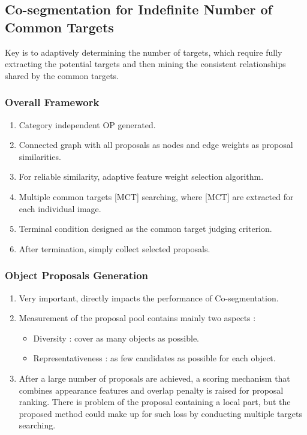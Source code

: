 \documentclass{article}
\begin{document}
\subsection{Co-segmentation for Indefinite Number of Common Targets}
Key is to adaptively determining the number of targets, which require fully extracting the potential targets and then mining the consistent relationships shared by the common targets.

\subsubsection{Overall Framework}
\begin{enumerate}
\item Category independent OP generated.
\item Connected graph with all proposals as nodes and edge weights as proposal similarities.
\item For reliable similarity, adaptive feature weight selection algorithm.
\item Multiple common targets [MCT] searching, where [MCT] are extracted for each individual image.
\item Terminal condition designed as the common target judging criterion.
\item After termination, simply collect selected proposals.
\end{enumerate}

\subsubsection{Object Proposals Generation}
\begin{enumerate}
\item Very important, directly impacts the performance of Co-segmentation.
\item Measurement of the proposal pool contains mainly two aspects :
  \begin{itemize}
  \item Diversity : cover as many objects as possible.
  \item Representativeness : as few candidates as possible for each object.
  \end{itemize}
\item After a large number of proposals are achieved, a scoring mechanism that combines appearance features and overlap penalty is raised for proposal ranking. There is problem of the proposal containing a local part, but the proposed method could make up for such loss by conducting multiple targets searching.
\end{enumerate}
\end{document}
